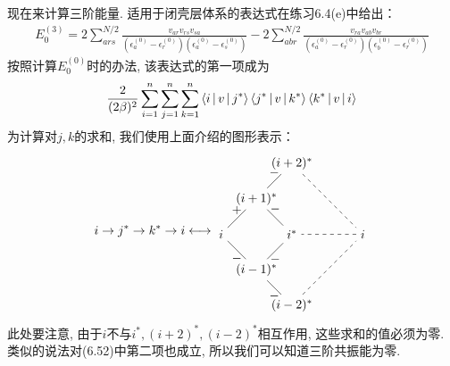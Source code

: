现在来计算三阶能量. 适用于闭壳层体系的表达式在练习6.4(e)中给出：
\begin{align}
E_0^{(3)} = 2\sum_{ars}^{N/2}\frac{v_{ar}v_{rs}v_{sa}}{(\epsilon^{(0)}_a-\epsilon^{(0)}_r)(\epsilon^{(0)}_a-\epsilon^{(0)}_s)} - 2\sum_{abr}^{N/2}\frac{v_{ra}v_{ab}v_{br}}{(\epsilon^{(0)}_a-\epsilon^{(0)}_r)(\epsilon^{(0)}_b-\epsilon^{(0)}_r)}
\end{align}
按照计算$E_0^{(0)}$时的办法, 该表达式的第一项成为
\begin{align}
\frac{2}{(2\beta)^2}\sum_{i=1}^{n}\sum_{j=1}^{n}\sum_{k=1}^{n}\Braket{i|v|j^*}\Braket{j^*|v|k^*}\Braket{k^*|v|i}
\end{align}
为计算对$j,k$的求和, 我们使用上面介绍的图形表示：
\begin{align*}
i\to j^* \to k^* \to i \longleftrightarrow 
\begin{tikzpicture}[baseline={(0,0)}]
\node(i)at(0,0){$i$};\node(ip1)at(1,1){$(i+1)^*$};\node(ip2)at(2,2){$(i+2)^*$};\node(is)at(2,0){$i^*$};\node(im1)at(1,-1){$(i-1)^*$};\node(im2)at(2,-2){$(i-2)^*$};\node(ie)at(4,0){$i$};
\draw (i)--node[above]{+}(ip1)--node[above]{$-$}(is)--node[below]{$-$}(im1)--node[below]{$-$}(i);
\draw (ip1)--node[above]{$-$}(ip2);
\draw (im1)--node[below]{$-$}(im2);
\draw[dashed] (ip2)--(ie)--(is);
\draw[dashed] (im2)--(ie);
\end{tikzpicture}
\end{align*}
此处要注意, 由于$i$不与$i^*,(i+2)^*,(i-2)^*$相互作用, 这些求和的值必须为零. 类似的说法对(6.52)中第二项也成立, 所以我们可以知道三阶共振能为零.

